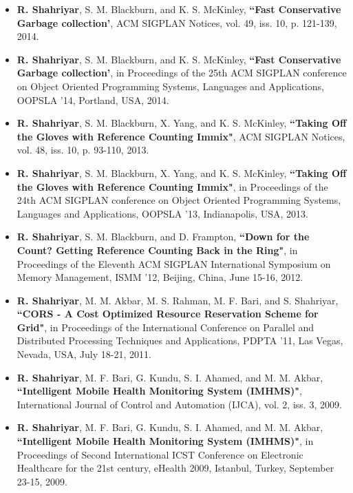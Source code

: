 \documentclass[letterpaper,11pt]{article}
\begin{document}
\begin{itemize}
\item {\bf R. Shahriyar}, S. M. Blackburn, and K. S. McKinley,  {\color{black} \bf
    ``Fast Conservative Garbage collection'}, ACM SIGPLAN Notices, 
vol. 49, iss. 10, p. 121-139, 2014.

\item {\bf R. Shahriyar}, S. M. Blackburn, and K. S. McKinley,  {\color{black} \bf
    ``Fast Conservative Garbage collection'}, in Proceedings of the 25th ACM SIGPLAN conference on Object Oriented Programming Systems, Languages and Applications, OOPSLA '14, Portland, USA, 2014.

\item {\bf R. Shahriyar}, S. M. Blackburn, X. Yang, and K. S. McKinley, {\color{black} \bf
    ``Taking Off the Gloves with Reference Counting Immix"},  ACM SIGPLAN Notices, 
vol. 48, iss. 10, p. 93-110, 2013.

\item {\bf R. Shahriyar}, S. M. Blackburn, X. Yang, and K. S. McKinley, {\color{black} \bf
    ``Taking Off the Gloves with Reference Counting Immix"},  in Proceedings of the 24th ACM SIGPLAN conference on Object Oriented Programming Systems, Languages and Applications, OOPSLA '13, Indianapolis, USA, 2013.

\item {\bf R. Shahriyar}, S. M. Blackburn, and D. Frampton,  {\color{black} \bf
    ``Down for the Count? Getting Reference Counting Back in the Ring"}, in Proceedings of the Eleventh ACM SIGPLAN International Symposium on Memory Management, ISMM '12, Beijing, China, June 15-16, 2012.

\item {\bf R. Shahriyar}, M. M. Akbar, M. S. Rahman, M. F. Bari, and S. Shahriyar, {\color{black} \bf
    ``CORS - A Cost Optimized Resource Reservation Scheme for Grid"}, in Proceedings of the International Conference on Parallel and Distributed Processing Techniques and Applications, PDPTA '11, Las Vegas, Nevada, USA, July 18-21, 2011. 

\item {\bf R. Shahriyar}, M. F. Bari, G. Kundu, S. I. Ahamed, and M. M. Akbar,  {\color{black} \bf
    ``Intelligent Mobile Health Monitoring System (IMHMS)"}, International Journal of Control and Automation (IJCA), vol. 2, iss. 3, 2009. 
    
\item {\bf R. Shahriyar}, M. F. Bari, G. Kundu, S. I. Ahamed, and M. M. Akbar,  {\color{black} \bf
    ``Intelligent Mobile Health Monitoring System (IMHMS)"}, in Proceedings of Second International ICST Conference on Electronic Healthcare for the 21st century, eHealth 2009, Istanbul, Turkey, September 23-15, 2009.



\end{itemize}
\end{document}
